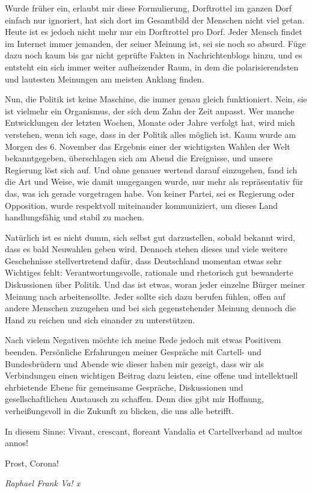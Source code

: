 \begin{multicols}{2}
Wurde früher ein, erlaubt mir diese Formulierung, Dorftrottel im ganzen
Dorf einfach nur ignoriert, hat sich dort im Gesamtbild der Menschen nicht viel
getan. Heute ist es jedoch nicht mehr nur ein Dorftrottel pro Dorf. Jeder
Mensch findet im Internet immer jemanden, der seiner Meinung ist, sei sie noch
so absurd. Füge dazu noch kaum bis gar nicht geprüfte Fakten in
Nachrichtenblogs hinzu, und es entsteht ein sich immer weiter aufheizender
Raum, in dem die polarisierendsten und lautesten Meinungen am meisten Anklang
finden.

Nun, die Politik ist keine Maschine, die
immer genau gleich funktioniert. Nein, sie ist vielmehr ein
Organismus, der sich dem Zahn der Zeit anpasst. Wer manche Entwicklungen der
letzten Wochen, Monate oder Jahre verfolgt hat, wird mich verstehen, wenn ich
sage, dass in der Politik alles möglich ist. Kaum wurde am Morgen des 6.
November das Ergebnis einer der wichtigsten Wahlen der Welt bekanntgegeben,
überschlagen sich am Abend die Ereignisse, und unsere Regierung löst sich auf.
Und ohne genauer wertend darauf einzugehen, fand ich die Art und Weise, wie
damit umgegangen wurde, nur mehr als repräsentativ für das, was ich gerade
vorgetragen habe. Von keiner Partei, sei es Regierung oder Opposition, wurde
respektvoll miteinander kommuniziert, um dieses Land handlungsfähig und stabil
zu machen.

Natürlich ist es nicht dumm, sich selbst gut darzustellen, sobald bekannt
wird, dass es bald Neuwahlen geben wird. Dennoch stehen dieses und viele
weitere Geschehnisse stellvertretend dafür, dass Deutschland momentan etwas
sehr Wichtiges fehlt: Verantwortungsvolle, rationale und rhetorisch gut
bewanderte Diskussionen über Politik. Und das ist etwas, woran jeder einzelne
Bürger meiner Meinung nach arbeiten\newline sollte. Jeder sollte sich dazu berufen
fühlen, offen auf andere Menschen zuzugehen und bei sich gegenstehender Meinung
dennoch die Hand zu reichen und sich einander zu unterstützen.

Nach vielem Negativen möchte ich meine Rede jedoch mit etwas Positivem
beenden. Persönliche Erfahrungen meiner Gespräche mit Cartell- und
Bundesbrüdern und Abende wie dieser haben mir gezeigt, dass wir als
Verbindungen einen wichtigen Beitrag dazu leisten, eine offene und
intellektuell ehrbietende Ebene für gemeinsame Gespräche, Diskussionen und
gesellschaftlichen Austausch zu schaffen. Denn dies gibt mir Hoffnung,
verheißungsvoll in die Zukunft zu blicken, die uns alle betrifft.

In diesem Sinne: Vivant, crescant,
floreant Vandalia et Cartellverband ad multos annos!

Prost, Corona!

	\begin{flushright}
		\hfill\emph{Raphael Frank Va! x}
	\end{flushright}
\end{multicols}

